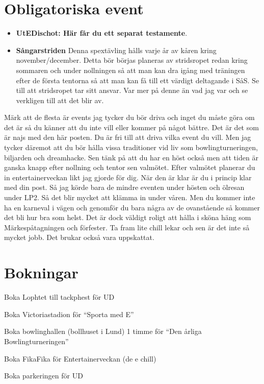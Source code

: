 \documentclass[10pt]{article}
\begin{document}
    \section{Obligatoriska event}
    \begin{itemize}
        \item \textbf{UtEDischot: Här får du ett separat testamente}.
        \item \textbf{Sångarstriden} \newline
        Denna spextävling hålls varje år av kåren kring november/december. Detta bör börjas planeras av stridsropet redan kring sommaren och under nollningen så att man kan dra igång med träningen efter de första tentorna så att man kan få till ett värdigt deltagande i SåS. Se till att stridsropet tar sitt ansvar. Var mer på denne än vad jag var och se verkligen till att det blir av.

    \end{itemize}

    Märk att de flesta är events jag tycker du bör driva och inget du måste göra om det är så du känner att du inte vill eller kommer på något bättre. Det är det som är najs med den här posten. Du är fri till att driva vilka event du vill. Men jag tycker däremot att du bör hålla vissa traditioner vid liv som bowlingturneringen, biljarden och dreamhacke. Sen tänk på att du har en höst också men att tiden är ganska knapp efter nollning och tentor sen valmötet. \newline
    Efter valmötet planerar du in entertainerveckan likt jag gjorde för dig. När den är klar är du i princip klar med din post. Så jag körde bara de mindre eventen under hösten och ölresan under LP2. Så det blir mycket att klämma in under våren. Men du kommer inte ha en karneval i vägen och genomför du bara några av de ovanstående så kommer det bli hur bra som helst. Det är dock väldigt roligt att hålla i sköna häng som Märkespåtagningen och förfester. Ta fram lite chill lekar och sen är det inte så mycket jobb. Det brukar också vara uppskattat.

    \section{Bokningar}
    \begin{dashlist}
        \item Boka Lophtet till tackphest för UD
        \item Boka Victoriastadion för ``Sporta med E''
        \item Boka bowlinghallen (bollhuset i Lund) 1 timme för ``Den årliga Bowlingturneringen''
        \item Boka FikaFika för Entertainerveckan (de e chill)
        \item Boka parkeringen för UD
    \end{dashlist}
\end{document}
